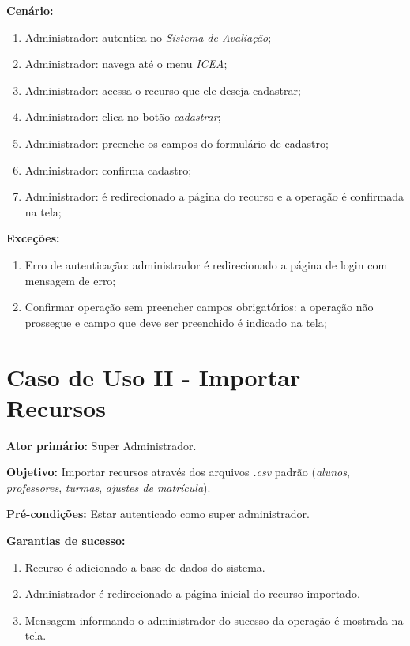 \documentclass[
  12pt,       %
  openright,      %
  oneside,      %
  a4paper,      %
  english,      %
  french,        %
  spanish,     %
  brazil        %
  ]{abntex2-decsi}
\begin{document}
\begin{apendicesenv}
		\textbf{Cenário:}
		
		\begin{enumerate}
			\item Administrador: autentica no \textit{Sistema de Avaliação};		
			\item Administrador: navega até o menu \textit{ICEA};	
			\item Administrador: acessa o recurso que ele deseja cadastrar;		
			\item Administrador: clica no botão \textit{cadastrar};
			\item Administrador: preenche os campos do formulário de cadastro;
            \item Administrador: confirma cadastro;
            \item Administrador: é redirecionado a página do recurso e a operação é confirmada na tela;
		\end{enumerate}
		
		\textbf{Exceções:}
		
			\begin{enumerate}	
				\item Erro de autenticação: administrador é redirecionado a página de login com mensagem de erro;
				\item Confirmar operação sem preencher campos obrigatórios: a operação não prossegue e campo que deve ser preenchido é indicado na tela;
			\end{enumerate}
    
    \newpage
    
    \section{Caso de Uso II - Importar Recursos}
    
	\textbf{Ator primário:} Super Administrador.
				
    \textbf{Objetivo:} Importar recursos através dos arquivos \textit{.csv} padrão (\textit{alunos}, \textit{professores}, \textit{turmas}, \textit{ajustes de matrícula}).
    
	\textbf{Pré-condições:} Estar autenticado como super administrador.
		
	\textbf{Garantias de sucesso:} 
        
            \begin{enumerate}
            
            \item Recurso é adicionado a base de dados do sistema.  
            \item Administrador é redirecionado a página inicial do recurso importado.
            \item Mensagem informando o administrador do sucesso da operação é mostrada na tela.
            

\end{enumerate}
\end{apendicesenv}
\end{document}
